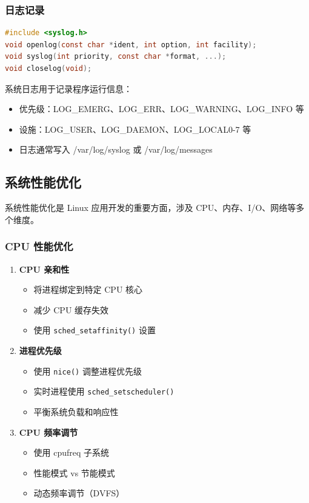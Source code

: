 \subsubsection{日志记录}


\begin{lstlisting}[language=C]
#include <syslog.h>
void openlog(const char *ident, int option, int facility);
void syslog(int priority, const char *format, ...);
void closelog(void);
\end{lstlisting}

系统日志用于记录程序运行信息：
\begin{itemize}
  \item 优先级：LOG\_EMERG、LOG\_ERR、LOG\_WARNING、LOG\_INFO 等
  \item 设施：LOG\_USER、LOG\_DAEMON、LOG\_LOCAL0-7 等
  \item 日志通常写入 /var/log/syslog 或 /var/log/messages
\end{itemize}

\subsection{系统性能优化}

系统性能优化是 Linux 应用开发的重要方面，涉及 CPU、内存、I/O、网络等多个维度。

\subsubsection{CPU 性能优化}

\begin{enumerate}
  \item \textbf{CPU 亲和性}
    \begin{itemize}
      \item 将进程绑定到特定 CPU 核心
      \item 减少 CPU 缓存失效
      \item 使用 \texttt{sched\_setaffinity()} 设置
    \end{itemize}

  \item \textbf{进程优先级}
    \begin{itemize}
      \item 使用 \texttt{nice()} 调整进程优先级
      \item 实时进程使用 \texttt{sched\_setscheduler()}
      \item 平衡系统负载和响应性
    \end{itemize}

  \item \textbf{CPU 频率调节}
    \begin{itemize}
      \item 使用 cpufreq 子系统
      \item 性能模式 vs 节能模式
      \item 动态频率调节（DVFS）
    \end{itemize}
\end{enumerate}

